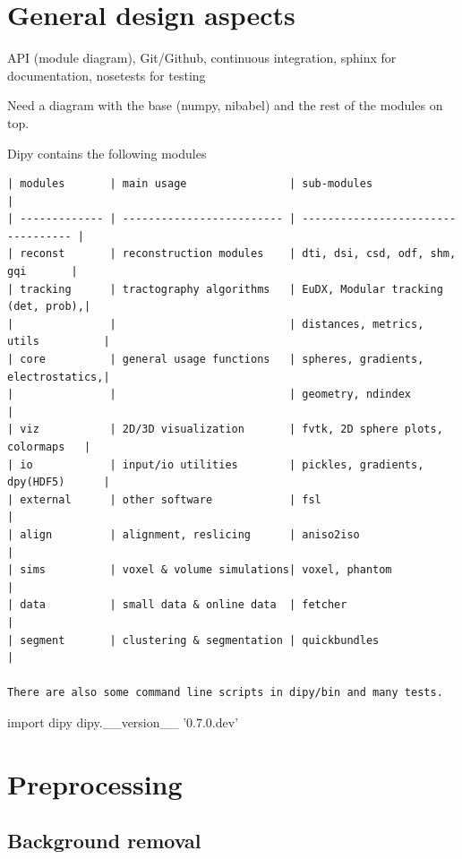 \documentclass{bioinfo}
\begin{document}
\section{General design aspects}

API (module diagram), Git/Github, continuous integration, sphinx for documentation, nosetests for testing

Need a diagram with the base (numpy, nibabel) and the rest of the modules on top.

Dipy contains the following modules

\tiny
\begin{verbatim}
| modules       | main usage                | sub-modules                        |
| ------------- | ------------------------- | ---------------------------------- |
| reconst       | reconstruction modules    | dti, dsi, csd, odf, shm, gqi       |
| tracking      | tractography algorithms   | EuDX, Modular tracking (det, prob),|
|               |                           | distances, metrics, utils          |
| core          | general usage functions   | spheres, gradients, electrostatics,|
|               |                           | geometry, ndindex                  |       
| viz           | 2D/3D visualization       | fvtk, 2D sphere plots, colormaps   |
| io            | input/io utilities        | pickles, gradients, dpy(HDF5)      |
| external      | other software            | fsl                                |
| align         | alignment, reslicing      | aniso2iso                          |
| sims          | voxel & volume simulations| voxel, phantom                     |
| data          | small data & online data  | fetcher                            |
| segment       | clustering & segmentation | quickbundles                       |

There are also some command line scripts in dipy/bin and many tests.
\end{verbatim}
\normalsize

\begin{python}
import dipy
dipy.__version__
'0.7.0.dev'
\end{python}

\section{Preprocessing}

\subsection{Background removal}
\end{document}
